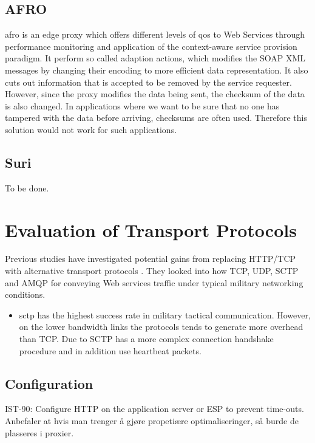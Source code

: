 \subsection{AFRO}

\gls{afro} is an edge proxy which offers different levels of \gls{qos} to Web
Services through performance monitoring and application of the context-aware
service provision paradigm. It perform so called adaption actions, which
modifies the SOAP XML messages by changing their encoding to more efficient data
representation. It also cuts out information that is accepted to be removed by
the service requester. However, since the proxy modifies the data being sent,
the checksum of the data is also changed. In applications where we want to be
sure that no one has tampered with the data before arriving, checksums are often
used. Therefore this solution would not work for such applications.


\subsection{Suri}
To be done.

\section{Evaluation of Transport Protocols}

Previous studies have investigated potential gains from replacing HTTP/TCP
with alternative transport protocols
\cite{evaluation-transport-protocols-web-services}. They looked into how TCP,
UDP, SCTP and AMQP for conveying Web services traffic under typical military
networking conditions.

\begin{itemize}
    \item \gls{sctp} has the highest success rate in military tactical
    communication. However, on the lower bandwidth links the protocols tends to
     generate more overhead than TCP. Due to SCTP has a more complex connection
     handshake procedure and in addition use heartbeat packets.
\end{itemize}

\subsection{Configuration}
IST-90: Configure HTTP on the application server or ESP to prevent time-outs.
Anbefaler at hvis man trenger å gjøre propetiære optimaliseringer, så burde de
plasseres i proxier.

